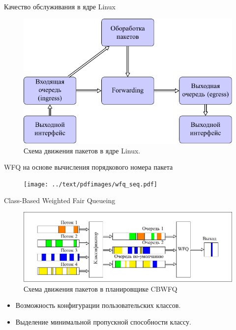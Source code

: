 \documentclass[12pt]{beamer}
\begin{document}
\begin{frame}{Качество обслуживания в ядре Linux}
	\begin{figure}
		\center
    	\includegraphics[scale=0.8]{../text/pdfimages/qdisc.pdf}
		\caption*{Схема движения пакетов в ядре Linux.}
	\end{figure}
\end{frame}

\begin{frame}{WFQ на основе вычисления порядкового номера пакета}
	\begin{figure}
		\center
    	\texttt{[image: ../text/pdfimages/wfq\_seq.pdf]}
		\caption*{}
	\end{figure}
\end{frame}

\begin{frame}{Class-Based Weighted Fair Queueing}
	\begin{figure}
		\center
    	\includegraphics[scale=0.8]{../text/pdfimages/cbwfq.pdf}
		\caption*{Схема движения пакетов в планировщике CBWFQ}
	\end{figure}

	\begin{center}
{\footnotesize
	\begin{itemize}
		\item Возможность конфигурации пользовательских классов.
		\item Выделение минимальной пропускной способности классу.
	\end{itemize}
}
	\end{center}
\end{frame}
\end{document}
